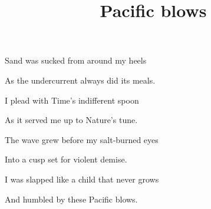 \documentclass{article}
\title{Pacific blows}
\begin{document}
 \newline

Sand was sucked from around my heels\newline\newline

As the undercurrent always did its meals.\newline\newline

I plead with Time's indifferent spoon\newline\newline

As it served me up to Nature's tune.\newline\newline
\newline\newline

The wave grew before my salt-burned eyes\newline\newline

Into a cusp set for violent demise.\newline\newline

I was slapped like a child that never grows\newline\newline

And humbled by these Pacific blows.\newline\newline
\end{document}
